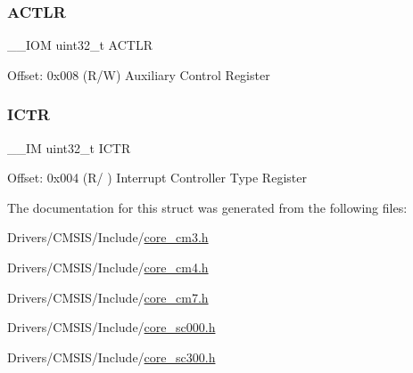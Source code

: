\subsubsection{\texorpdfstring{A\+C\+T\+LR}{ACTLR}}
{\footnotesize\ttfamily \+\_\+\+\_\+\+I\+OM uint32\+\_\+t A\+C\+T\+LR}

Offset\+: 0x008 (R/W) Auxiliary Control Register \mbox{\label{struct_s_cn_s_c_b___type_acf9b76331abd768af25a10b3625da4b4}} 
\subsubsection{\texorpdfstring{I\+C\+TR}{ICTR}}
{\footnotesize\ttfamily \+\_\+\+\_\+\+IM uint32\+\_\+t I\+C\+TR}

Offset\+: 0x004 (R/ ) Interrupt Controller Type Register 

The documentation for this struct was generated from the following files\+:\begin{DoxyCompactItemize}
\item 
Drivers/\+C\+M\+S\+I\+S/\+Include/\mbox{\hyperlink{core__cm3_8h}{core\+\_\+cm3.\+h}}\item 
Drivers/\+C\+M\+S\+I\+S/\+Include/\mbox{\hyperlink{core__cm4_8h}{core\+\_\+cm4.\+h}}\item 
Drivers/\+C\+M\+S\+I\+S/\+Include/\mbox{\hyperlink{core__cm7_8h}{core\+\_\+cm7.\+h}}\item 
Drivers/\+C\+M\+S\+I\+S/\+Include/\mbox{\hyperlink{core__sc000_8h}{core\+\_\+sc000.\+h}}\item 
Drivers/\+C\+M\+S\+I\+S/\+Include/\mbox{\hyperlink{core__sc300_8h}{core\+\_\+sc300.\+h}}\end{DoxyCompactItemize}
